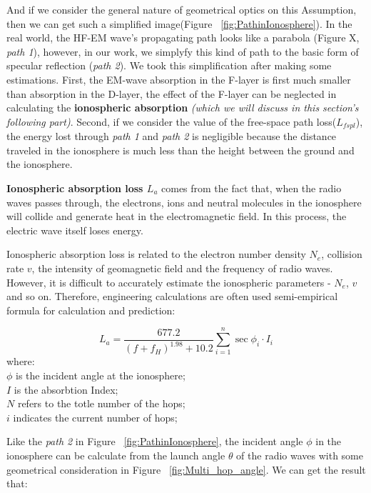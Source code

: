 \documentclass{mcmthesis}
\begin{document}
    And if we consider the general nature of geometrical optics on this Assumption, then we can get such a simplified image(Figure ~\ref{fig:PathinIonosphere}). In the real world, the HF-EM wave's propagating path looks like a parabola (Figure X, \emph{path 1}), however, in our work, we simplyfy this kind of path to the basic form of specular reflection (\emph{path 2}). We took this simplification after making some estimations. First, the EM-wave absorption in the F-layer is first much smaller than absorption in the D-layer, the effect of the F-layer can be neglected in calculating the \textbf{ionospheric absorption} \emph{(which we will discuss in this section's following part)}. Second, if we consider the value of the free-space path loss($L_{fspl}$), the energy lost through \emph{path 1} and \emph{path 2} is negligible because the distance traveled in the ionosphere is much less than the height between the ground and the ionosphere.

    \textbf{Ionospheric absorption loss $L_{a}$} comes from the fact that, when the radio waves passes through, the electrons, ions and neutral molecules in the ionosphere will collide and generate heat in the electromagnetic field. In this process, the electric wave itself loses energy.

    Ionospheric absorption loss is related to the electron number density $N_{e}$, collision rate $v$, the intensity of geomagnetic field and the frequency of radio waves. However, it is difficult to accurately estimate the ionospheric parameters - $N_{e}$, $v$ and so on. Therefore, engineering calculations are often used semi-empirical formula for calculation and prediction\cite{terman1943radio}:

     \begin{equation}\label{eq:IonosphereLoss}
      L_{a} = \frac{677.2}{(f + f_{H})^{1.98} + 10.2}\sum_{i = 1}^{n}\sec\phi_{i} \cdot I_{i}
     \end{equation}
     where:\\
     $\phi$ is the incident angle at the ionosphere;\\
     $I$ is the absorbtion Index;\\
     $N$ refers to the totle number of the hops;\\
     $i$ indicates the current number of hops;

    Like the \emph{path 2} in Figure ~\ref{fig:PathinIonosphere}, the incident angle $\phi$ in the ionosphere can be calculate from the launch angle $\theta$ of the radio waves with some geometrical consideration in Figure ~\ref{fig:Multi_hop_angle}. We can get the result that:
\end{document}
